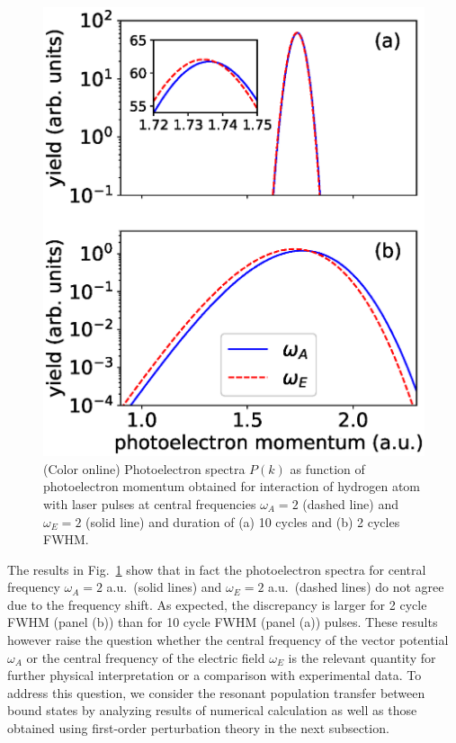 \begin{figure}[t]
\centering
    \includegraphics[width=0.8\linewidth]{figs/Frequency_shift/single_photon_ion.eps}
\caption{(Color online)
Photoelectron spectra $P(k)$ as function of photoelectron momentum obtained for interaction of hydrogen atom with laser pulses at central frequencies $\omega_A=2$ (dashed line) and $\omega_E=2$ (solid line) and duration of (a) 10 cycles and (b) 2 cycles FWHM.
}
  \label{fig:ionizationA}
\end{figure}

The results in Fig.~\ref{fig:ionizationA} show that in fact the photoelectron spectra for central frequency $\omega_A = 2$ a.u.\  (solid lines) and $\omega_E = 2$ a.u.\  (dashed lines) do not agree due to the frequency shift. As expected, the discrepancy is larger for 2 cycle FWHM (panel (b)) than for 10 cycle FWHM (panel (a)) pulses. These results however raise the question whether the central frequency of the vector potential $\omega_A$ or the central frequency of the electric field $\omega_E$ is the relevant quantity for further physical interpretation or a comparison with experimental data. To address this question, we consider the resonant population transfer between bound states by analyzing results of numerical calculation as well as those obtained using first-order perturbation theory in the next subsection.

